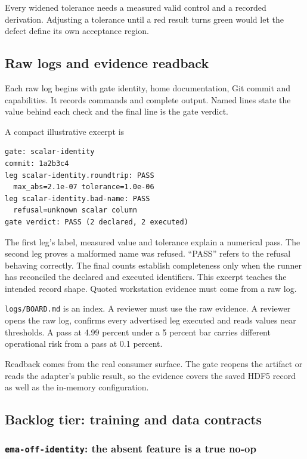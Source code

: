 \documentclass[10pt,aps,prd,twocolumn,nofootinbib]{revtex4-2}
\newcommand{\code}[1]{\texttt{#1}}
\begin{document}
Every widened tolerance needs a measured valid control and a recorded
derivation.  Adjusting a tolerance until a red result turns green would let the
defect define its own acceptance region.

\subsection{Raw logs and evidence readback}

Each raw log begins with gate identity, home documentation, Git commit and
capabilities.  It records commands and complete output.  Named lines state the
value behind each check and the final line is the gate verdict.

A compact illustrative excerpt is
\begin{verbatim}
gate: scalar-identity
commit: 1a2b3c4
leg scalar-identity.roundtrip: PASS
  max_abs=2.1e-07 tolerance=1.0e-06
leg scalar-identity.bad-name: PASS
  refusal=unknown scalar column
gate verdict: PASS (2 declared, 2 executed)
\end{verbatim}
The first leg's label, measured value and tolerance explain a numerical pass.
The second leg proves a malformed name was refused. ``PASS'' refers to the
refusal behaving correctly.  The final counts establish completeness only
when the runner has reconciled the declared and executed identifiers.  This
excerpt teaches the intended record shape.  Quoted workstation evidence must
come from a raw log.

\code{logs/BOARD.md} is an index.  A reviewer must use the raw evidence.  A reviewer
opens the raw log, confirms every advertised leg executed and reads values
near thresholds.  A pass at 4.99 percent under a 5 percent bar carries
different operational risk from a pass at 0.1 percent.

Readback comes from the real consumer surface.  The gate reopens the artifact
or reads the adapter's public result, so the evidence covers the saved HDF5
record as well as the in-memory configuration.

\subsection{Backlog tier: training and data contracts}

\subsubsection{\code{ema-off-identity}: the absent feature is a true no-op}
\end{document}
